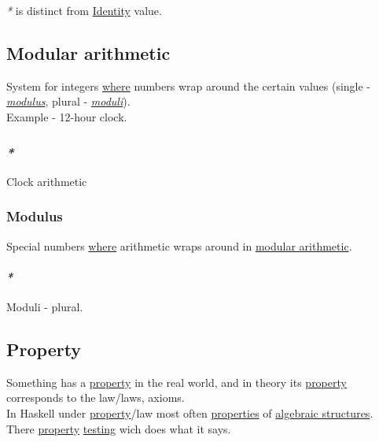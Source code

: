 \documentclass[11pt]{article}
\begin{document}
\emph{*} is distinct from \hyperref[org3bbbadd]{Identity} value.\\

\subsection{\label{orgdbe0804}Modular arithmetic}
\label{sec:orgb8f14fe}
System for integers \hyperref[orgefd1ecd]{where} numbers wrap around the certain values (single - \emph{\hyperref[org644723d]{modulus}}, plural - \emph{\hyperref[org25fb413]{moduli}}).\\

Example - 12-hour clock.\\

\subsubsection{\emph{*}}
\label{sec:orgf76a0a4}

\label{org865c441}Clock arithmetic\\

\subsubsection{\label{org644723d}Modulus}
\label{sec:org9194561}
Special numbers \hyperref[orgefd1ecd]{where} arithmetic wraps around in \hyperref[orgdbe0804]{modular arithmetic}.\\

\paragraph{\emph{*}}
\label{sec:org45ce3ce}

\label{org25fb413}Moduli - plural.\\

\subsection{\label{org07ca26b}Property}
\label{sec:orge84e832}
Something has a \hyperref[org07ca26b]{property} in the real world, and in theory its \hyperref[org07ca26b]{property} corresponds to the law/laws, axioms.\\

In Haskell under \hyperref[org07ca26b]{property}/law most often \hyperref[org763ad6b]{properties} of \hyperref[orgbade927]{algebraic structures}.\\

There \hyperref[org07ca26b]{property} \hyperref[orgba42eb2]{testing} wich does what it says.\\
\end{document}
